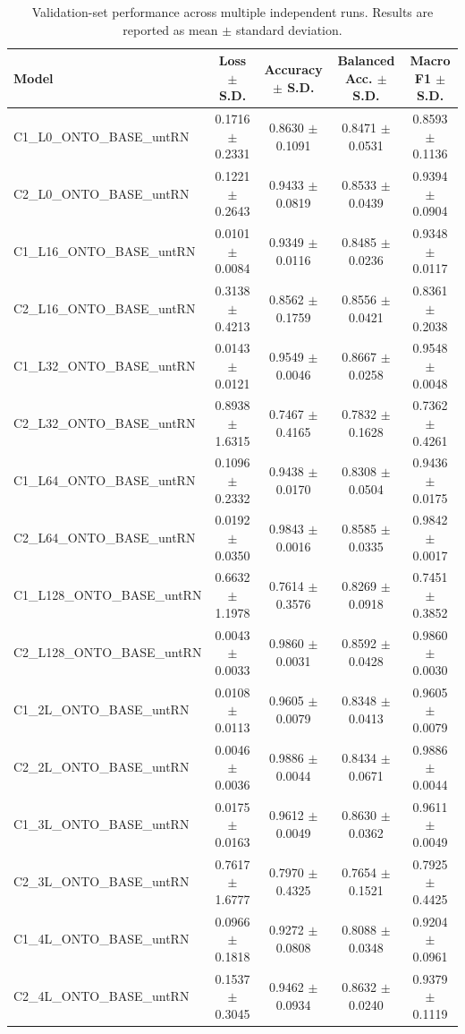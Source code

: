 \begin{table}[t]
\centering
\begin{tabular}{l c c c c}
\toprule
Model & Loss $\pm$ S.D. & Accuracy $\pm$ S.D. & Balanced Acc. $\pm$ S.D. & Macro F1 $\pm$ S.D. \\
\midrule
C1_L0_ONTO_BASE_untRN & 0.1716 $\pm$ 0.2331 & 0.8630 $\pm$ 0.1091 & 0.8471 $\pm$ 0.0531 & 0.8593 $\pm$ 0.1136 \\
C2_L0_ONTO_BASE_untRN & 0.1221 $\pm$ 0.2643 & 0.9433 $\pm$ 0.0819 & 0.8533 $\pm$ 0.0439 & 0.9394 $\pm$ 0.0904 \\
C1_L16_ONTO_BASE_untRN & 0.0101 $\pm$ 0.0084 & 0.9349 $\pm$ 0.0116 & 0.8485 $\pm$ 0.0236 & 0.9348 $\pm$ 0.0117 \\
C2_L16_ONTO_BASE_untRN & 0.3138 $\pm$ 0.4213 & 0.8562 $\pm$ 0.1759 & 0.8556 $\pm$ 0.0421 & 0.8361 $\pm$ 0.2038 \\
C1_L32_ONTO_BASE_untRN & 0.0143 $\pm$ 0.0121 & 0.9549 $\pm$ 0.0046 & 0.8667 $\pm$ 0.0258 & 0.9548 $\pm$ 0.0048 \\
C2_L32_ONTO_BASE_untRN & 0.8938 $\pm$ 1.6315 & 0.7467 $\pm$ 0.4165 & 0.7832 $\pm$ 0.1628 & 0.7362 $\pm$ 0.4261 \\
C1_L64_ONTO_BASE_untRN & 0.1096 $\pm$ 0.2332 & 0.9438 $\pm$ 0.0170 & 0.8308 $\pm$ 0.0504 & 0.9436 $\pm$ 0.0175 \\
C2_L64_ONTO_BASE_untRN & 0.0192 $\pm$ 0.0350 & 0.9843 $\pm$ 0.0016 & 0.8585 $\pm$ 0.0335 & 0.9842 $\pm$ 0.0017 \\
C1_L128_ONTO_BASE_untRN & 0.6632 $\pm$ 1.1978 & 0.7614 $\pm$ 0.3576 & 0.8269 $\pm$ 0.0918 & 0.7451 $\pm$ 0.3852 \\
C2_L128_ONTO_BASE_untRN & 0.0043 $\pm$ 0.0033 & 0.9860 $\pm$ 0.0031 & 0.8592 $\pm$ 0.0428 & 0.9860 $\pm$ 0.0030 \\
C1_2L_ONTO_BASE_untRN & 0.0108 $\pm$ 0.0113 & 0.9605 $\pm$ 0.0079 & 0.8348 $\pm$ 0.0413 & 0.9605 $\pm$ 0.0079 \\
C2_2L_ONTO_BASE_untRN & 0.0046 $\pm$ 0.0036 & 0.9886 $\pm$ 0.0044 & 0.8434 $\pm$ 0.0671 & 0.9886 $\pm$ 0.0044 \\
C1_3L_ONTO_BASE_untRN & 0.0175 $\pm$ 0.0163 & 0.9612 $\pm$ 0.0049 & 0.8630 $\pm$ 0.0362 & 0.9611 $\pm$ 0.0049 \\
C2_3L_ONTO_BASE_untRN & 0.7617 $\pm$ 1.6777 & 0.7970 $\pm$ 0.4325 & 0.7654 $\pm$ 0.1521 & 0.7925 $\pm$ 0.4425 \\
C1_4L_ONTO_BASE_untRN & 0.0966 $\pm$ 0.1818 & 0.9272 $\pm$ 0.0808 & 0.8088 $\pm$ 0.0348 & 0.9204 $\pm$ 0.0961 \\
C2_4L_ONTO_BASE_untRN & 0.1537 $\pm$ 0.3045 & 0.9462 $\pm$ 0.0934 & 0.8632 $\pm$ 0.0240 & 0.9379 $\pm$ 0.1119 \\
\bottomrule
\end{tabular}
\caption{Validation-set performance across multiple independent runs. Results are reported as mean $\pm$ standard deviation.}
\label{tab:validation_results}
\end{table}